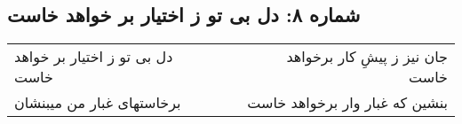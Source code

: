 \begin{center}
\section*{شماره ۸: دل بی تو ز اختیار بر خواهد خاست}
\label{sec:008}
\begin{longtable}{l p{0.5cm} r}
دل بی تو ز اختیار بر خواهد خاست
&&
جان نیز ز پیشِ کار برخواهد خاست
\\
برخاستهای غبار من میبنشان
&&
بنشین که غبار وار برخواهد خاست
\\
\end{longtable}
\end{center}
